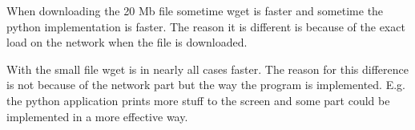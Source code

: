 \documentclass[a4paper,12pt,danish]{dnacm} %
\begin{document}
When downloading the 20 Mb file sometime wget is faster and sometime the python
implementation is faster. The reason it is different is because of the exact
load on the network when the file is downloaded.

With the small file wget is in nearly all cases faster. The reason for this
difference is not because of the network part but the way the program is
implemented. E.g. the python application prints more stuff to the screen and
some part could be implemented in a more effective way.
\end{document}
